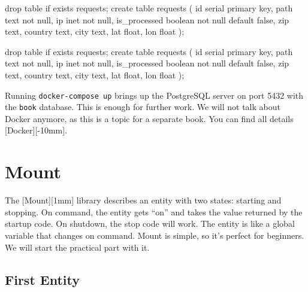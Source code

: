 
\ifnarrow

\begin{english}
  \begin{sql}
drop table if exists requests;
create table requests (
    id            serial primary key,
    path          text not null,
    ip            inet not null,
    is_processed  boolean not null
                  default false,
    zip           text,
    country       text,
    city          text,
    lat           float,
    lon           float
);
  \end{sql}
\end{english}

\else

\begin{english}
  \begin{sql}
drop table if exists requests;
create table requests (
    id            serial primary key,
    path          text not null,
    ip            inet not null,
    is_processed  boolean not null default false,
    zip           text,
    country       text,
    city          text,
    lat           float,
    lon           float
);
  \end{sql}
\end{english}

\fi

Running \verb|docker-compose up| brings up the PostgreSQL server on port 5432 with the \verb|book| database. This is enough for further work. We will not talk about Docker anymore, as this is a topic for a separate book. You can find all details [Docker][-10mm].

\section{Mount}


The [Mount][1mm] library describes an entity with two states: starting and stopping. On command, the entity gets ``on'' and takes the value returned by the startup code. On shutdown, the stop code will work. The entity is like a global variable that changes on command. Mount is simple, so it's perfect for beginners. We will start the practical part with it.

\subsection{First Entity}

